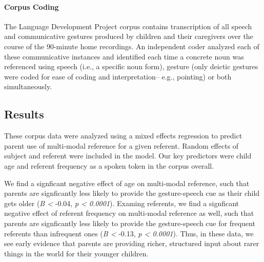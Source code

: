 \documentclass[10pt, letterpaper]{article}
\begin{document}
\hypertarget{corpus-coding}{%
\paragraph{Corpus Coding}\label{corpus-coding}}

The Language Development Project corpus contains transcription of all
speech and communicative gestures produced by children and their
caregivers over the course of the 90-minute home recordings. An
independent coder analyzed each of these communicative instances and
identified each time a concrete noun was referenced using speech (i.e.,
a specific noun form), gesture (only deictic gestures were coded for
ease of coding and interpretation-- e.g., pointing) or both
simultaneously.

\hypertarget{results}{%
\subsection{Results}\label{results}}

These corpus data were analyzed using a mixed effects regression to
predict parent use of multi-modal reference for a given referent. Random
effects of subject and referent were included in the model. Our key
predictors were child age and referent frequency as a spoken token in
the corpus overall.

We find a signficant negative effect of age on multi-modal reference,
such that parents are signficantly less likely to provide the
gesture-speech cue as their child gets older (\emph{B \textless{}}
-0.04, \emph{p \textless{} 0.0001}). Examing referents, we find a
signficant negative effect of referent frequency on multi-modal
reference as well, such that parents are signficantly less likely to
provide the gesture-speech cue for frequent referents than infrequent
ones (\emph{B \textless{}} -0.13, \emph{p \textless{} 0.0001}). Thus, in
these data, we see early evidence that parents are providing richer,
structured input about rarer things in the world for their younger
children.
\end{document}

